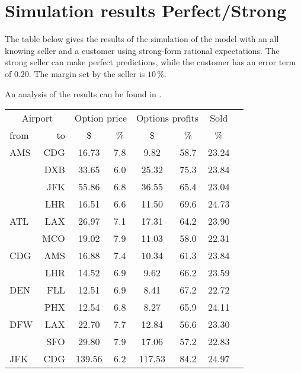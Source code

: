 \chapter{Simulation results Perfect/Strong}
\label{app:SimulationResultsPerfectStrong}
The table below gives the results of the simulation of the model with an all knowing seller and a customer using strong-form rational expectations. The strong seller can make perfect predictions, while the customer has an error term of $0.20$. The margin set by the seller is $10\,\%$.

An analysis of the results can be found in .
\\[2em]
\begin{table}[h]
    \small
    \begin{center}
        \begin{tabular}{l r c c c c c c}
            \toprule
            \multicolumn{2}{c}{Airport}  & \multicolumn{2}{c}{Option price} & \multicolumn{2}{c}{Options profits}  &  Sold  \\[.4ex]
            from  &  to  &  \$  & \%  &  \$  & \%  & \%  \\
            \midrule
AMS  &  CDG &   16.73  &     7.8  &    9.82  &    58.7  &   23.24  \\
     &  DXB &   33.65  &     6.0  &   25.32  &    75.3  &   23.84  \\
     &  JFK &   55.86  &     6.8  &   36.55  &    65.4  &   23.04  \\
     &  LHR &   16.51  &     6.6  &   11.50  &    69.6  &   24.73  \\[.5ex]
ATL  &  LAX &   26.97  &     7.1  &   17.31  &    64.2  &   23.90  \\
     &  MCO &   19.02  &     7.9  &   11.03  &    58.0  &   22.31  \\[.5ex]
CDG  &  AMS &   16.88  &     7.4  &   10.34  &    61.3  &   23.84  \\
     &  LHR &   14.52  &     6.9  &    9.62  &    66.2  &   23.59  \\[.5ex]
DEN  &  FLL &   12.51  &     6.9  &    8.41  &    67.2  &   22.72  \\
     &  PHX &   12.54  &     6.8  &    8.27  &    65.9  &   24.11  \\[.5ex]
DFW  &  LAX &   22.70  &     7.7  &   12.84  &    56.6  &   23.30  \\
     &  SFO &   29.80  &     7.9  &   17.06  &    57.2  &   22.83  \\[.5ex]
JFK  &  CDG &  139.56  &     6.2  &  117.53  &    84.2  &   24.97  \\

\end{tabular}
\end{center}
\end{table}
